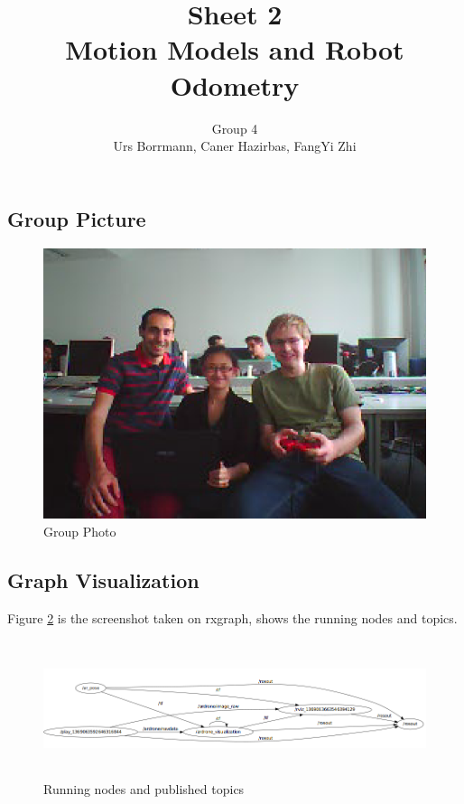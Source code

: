 \documentclass[14pt,a4paper]{article}
\title{\textbf{Sheet 2} \\  \textbf{Motion Models and Robot Odometry}}
\author{Group 4 \\Urs Borrmann, Caner Hazirbas, FangYi Zhi}
\begin{document}
\maketitle
\onehalfspacing

\section{}
	\subsection{Group Picture}
		\begin{figure}[htbp]
	\centering
	\includegraphics[scale=0.5]{groupPhoto.png}
  	\caption{Group Photo}
    \label{graph:groupPhoto}
	\end{figure}
	\subsection{Graph Visualization}

	Figure \ref{graph:rxgraph} is the screenshot taken on rxgraph, shows the running nodes and topics.\\
	
	\begin{figure}[htbp]
	\centering
	\includegraphics[width=165mm,height=40mm]{rxgraph.png}
  	\caption{Running nodes and published topics}
    \label{graph:rxgraph}
	\end{figure}
\end{document}
